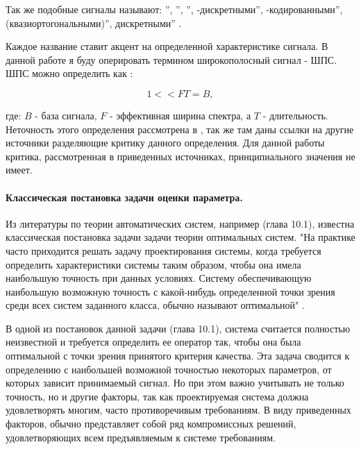 Так же подобные сигналы называют:
\textquotedblright,
\textquotedblright,
\textquotedblright,
-дискретными\textquotedblright,
-кодированными\textquotedblright,
 (квазиортогональными)\textquotedblright,
 дискретными\textquotedblright
\cite{gantmaher-book}.

Каждое название ставит акцент на определенной характеристике сигнала. В данной работе я буду оперировать термином
широкополосный сигнал - ШПС. ШПС можно определить как \cite{gantmaher-book, varakin-book}:
\begin{center}
\begin{equation}
	\label{eq:ss_signal}
	1 << FT = B,
\end{equation}
\end{center}
где: ${B}$ - база сигнала, ${F}$ - эффективная ширина спектра, а ${T}$ - длительность.
Неточность этого определения рассмотрена в \cite{gantmaher-book}, так же там даны ссылки на другие источники
разделяющие критику данного определения. Для данной работы критика, рассмотренная в приведенных источниках,
принципиального значения не имеет.

\paragraph{Классическая постановка задачи оценки параметра.}
Из литературы по теории автоматических систем, например \cite{pugachev} (глава 10.1), известна классическая постановка
задачи задачи теории оптимальных систем. "На практике часто приходится решать задачу проектирования системы, когда
требуется определить характеристики системы таким образом, чтобы она имела наибольшую точность при данных условиях.
Систему обеспечивающую наибольшую возможную точность с какой-нибудь определенной точки зрения среди всех систем
заданного класса, обычно называют оптимальной" \cite{pugachev}.

В одной из постановок данной задачи \cite{pugachev} (глава 10.1), система считается полностью неизвестной
и требуется определить ее оператор так, чтобы она была оптимальной с точки зрения принятого критерия качества. Эта
задача сводится к определению с наибольшей возможной точностью некоторых параметров, от которых зависит принимаемый
сигнал. Но при этом важно учитывать не только точность, но и другие факторы, так как проектируемая система должна
удовлетворять многим, часто противоречивым требованиям. В виду приведенных факторов, обычно представляет собой
ряд компромиссных решений, удовлетворяющих всем предъявляемым к системе требованиям.

